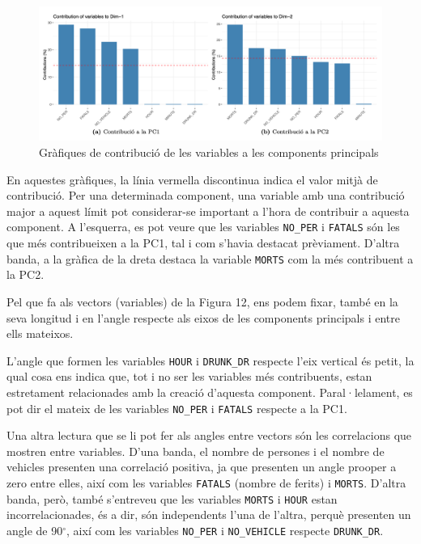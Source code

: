 \documentclass[11pt,longbibliography]{article}
\theoremstyle{definition}
\theoremstyle{remark}
\begin{document}
\begin{figure}[H]
\begin{center}
\includegraphics[width=15cm]{acp5}
\end{center}
\caption{Gràfiques de contribució de les variables a les components principals}
\label{fig:ACP5}
\end{figure}


En aquestes gràfiques, la línia vermella discontinua indica el valor mitjà de contribució. Per una determinada component, una variable amb una contribució major a aquest límit pot considerar-se important a l'hora de contribuir a aquesta component. A l'esquerra, es pot veure que les variables \texttt{NO\_PER} i \texttt{FATALS} són les que més contribueixen a la PC1, tal i com s'havia destacat prèviament. D'altra banda, a la gràfica de la dreta destaca la variable \texttt{MORTS} com la més contribuent a la PC2.


Pel que fa als vectors (variables) de la Figura 12, ens podem fixar, també en la seva longitud i en l'angle respecte als eixos de les components principals i entre ells mateixos. 


L'angle que formen les variables \texttt{HOUR} i \texttt{DRUNK\_DR} respecte l'eix vertical és petit, la qual cosa ens indica que, tot i no ser les variables més contribuents, estan estretament relacionades amb la creació d'aquesta component. Paral·lelament, es pot dir el mateix de les variables \texttt{NO\_PER} i \texttt{FATALS} respecte a la PC1.


Una altra lectura que se li pot fer als angles entre vectors són les correlacions que mostren entre variables. D'una banda, el nombre de persones i el nombre de vehicles presenten una correlació positiva, ja que presenten un angle prooper a zero entre elles, així com les variables \texttt{FATALS} (nombre de ferits) i \texttt{MORTS}. D'altra banda, però, també s'entreveu que les variables \texttt{MORTS} i \texttt{HOUR} estan incorrelacionades, és a dir, són independents l'una de l'altra, perquè presenten un angle de 90$^\circ$, així com les variables \texttt{NO\_PER} i \texttt{NO\_VEHICLE} respecte \texttt{DRUNK\_DR}.
\end{document}
